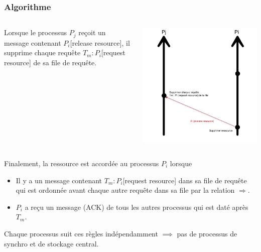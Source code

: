 \documentclass[compress]{beamer}
\begin{document}
\begin{frame}
\frametitle{Algorithme}
\begin{columns}
    	\begin{column}{.65\textwidth}
			Lorsque le processus $P_j$ reçoit un message contenant $P_i$[release resource], il supprime chaque requête $T_m : P_i$[request resource] de sa file de requête.
		\end{column}
		\begin{column}{.35\textwidth}
			\includegraphics[scale=0.13]{process11.png}
		\end{column}
	\end{columns}
	Finalement, la ressource est accordée au processus $P_i$ lorsque
	\begin{itemize}
	\item Il y a un message contenant $T_m : P_i$[request resource] dans sa file de requête qui est ordonnée avant chaque autre requête dans sa file par la relation $\Rightarrow$.
	\item $P_i$ a reçu un message (ACK) de tous les autres processus qui est daté après $T_m$.
	\end{itemize}
	{\color{cyan} Chaque processus} suit ces règles indépendamment $\implies$ pas de processus de synchro et de stockage central.
\end{frame}
\end{document}
